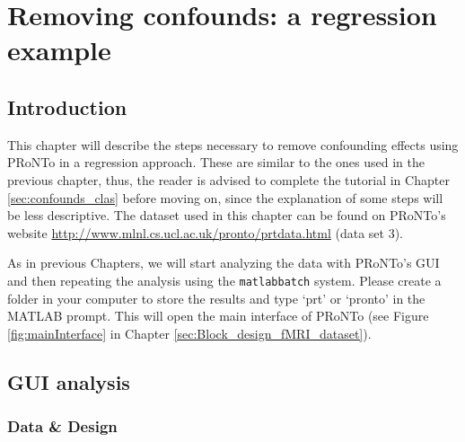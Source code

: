 
\chapter{Removing confounds: a regression example}
\label{sec:confounds_reg}
\minitoc

\section{Introduction}

This chapter will describe the steps necessary to remove confounding effects using PRoNTo in a regression approach. These are similar to the ones used in the previous chapter, thus, the reader is advised to complete the tutorial in Chapter \ref{sec:confounds_clas} before moving on, since the explanation of some steps will be less descriptive. The dataset used in this chapter can be found on PRoNTo's website \url{http://www.mlnl.cs.ucl.ac.uk/pronto/prtdata.html} (data set 3).


As in previous Chapters, we will start analyzing the data with PRoNTo's GUI and then repeating the analysis using the {\tt matlabbatch}  system. Please create a folder in your computer to store the results and type `prt’ or `pronto’ in the MATLAB prompt. This will open the main interface of PRoNTo (see Figure \ref{fig:mainInterface} in Chapter \ref{sec:Block_design_fMRI_dataset}).

\section{GUI analysis}

\subsection{Data \& Design}

